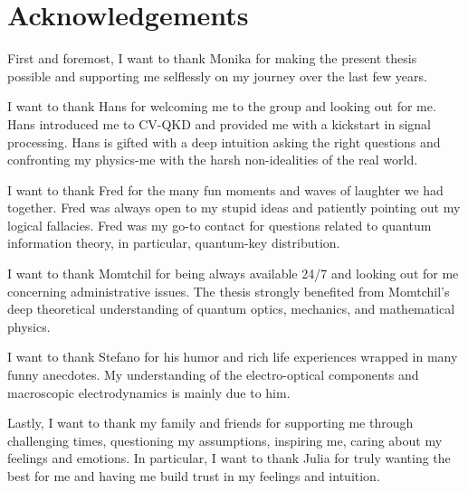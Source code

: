 
\chapter*{Acknowledgements}

First and foremost, I want to thank Monika for making the present thesis possible and supporting me selflessly on my journey over the last few years.

I want to thank Hans for welcoming me to the group and looking out for me. Hans introduced me to CV-QKD and provided me with a kickstart in signal processing. Hans is gifted with a deep intuition asking the right questions and confronting my physics-me with the harsh non-idealities of the real world.

I want to thank Fred for the many fun moments and waves of laughter we had together. Fred was always open to my stupid ideas and patiently pointing out my logical fallacies. Fred was my go-to contact for questions related to quantum information theory, in particular, quantum-key distribution.

I want to thank Momtchil for being always available 24/7 and looking out for me concerning administrative issues.
The thesis strongly benefited from Momtchil's deep theoretical understanding of quantum optics, mechanics, and mathematical physics.

I want to thank Stefano for his humor and rich life experiences wrapped in many funny anecdotes. My understanding of the electro-optical components and macroscopic electrodynamics is mainly due to him.

Lastly, I want to thank my family and friends for supporting me through challenging times, questioning my assumptions, inspiring me, caring about my feelings and emotions.
In particular, I want to thank Julia for truly wanting the best for me and having me build trust in my feelings and intuition.